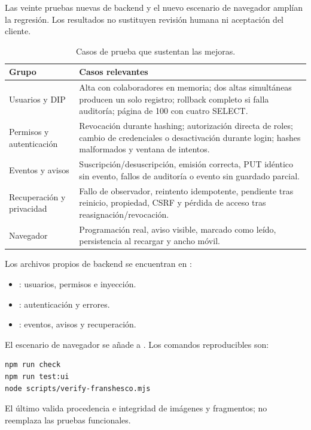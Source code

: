 Las veinte pruebas nuevas de backend y el nuevo escenario de navegador amplían
la regresión. Los resultados no sustituyen revisión humana ni aceptación del cliente.

\begingroup\setlength{\parskip}{0pt}
\begin{table}[htbp]\centering\small
\begin{tabular}{P{0.30\textwidth}P{0.62\textwidth}}
\toprule Grupo & Casos relevantes \\ \midrule
Usuarios y DIP & Alta con colaboradores en memoria; dos altas simultáneas producen un solo registro; rollback completo si falla auditoría; página de 100 con cuatro SELECT. \\
Permisos y autenticación & Revocación durante hashing; autorización directa de roles; cambio de credenciales o desactivación durante login; hashes malformados y ventana de intentos. \\
Eventos y avisos & Suscripción/desuscripción, emisión correcta, PUT idéntico sin evento, fallos de auditoría o evento sin guardado parcial. \\
Recuperación y privacidad & Fallo de observador, reintento idempotente, pendiente tras reinicio, propiedad, CSRF y pérdida de acceso tras reasignación/revocación. \\
Navegador & Programación real, aviso visible, marcado como leído, persistencia al recargar y ancho móvil. \\
\bottomrule
\end{tabular}
\caption{Casos de prueba que sustentan las mejoras.}
\end{table}\endgroup

Los archivos propios de backend se encuentran en :
\begin{itemize}
\item {}: usuarios, permisos e inyección.
\item {}: autenticación y errores.
\item {}: eventos, avisos y recuperación.
\end{itemize}
El escenario de navegador se añade a .
Los comandos reproducibles son:
\begin{lstlisting}[language={},numbers=none]
npm run check
npm run test:ui
node scripts/verify-franshesco.mjs
\end{lstlisting}
El último valida procedencia e integridad de imágenes y fragmentos; no reemplaza
las pruebas funcionales.

